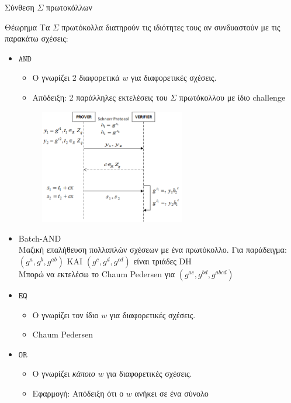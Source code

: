 \documentclass[handout]{beamer}
\begin{document}
\begin{frame}[allowframebreaks]{Σύνθεση $\Sigma$ πρωτοκόλλων}
\begin{block}{Θέωρημα} 
Τα $\Sigma$ πρωτόκολλα διατηρούν τις ιδιότητες τους αν συνδυαστούν με τις παρακάτω σχέσεις:
\end{block}
\begin{itemize}
\item $\mathtt{AND}$
\begin{itemize}
\item O \prv γνωρίζει 2 διαφορετικά $w$ για διαφορετικές σχέσεις.
\item Απόδειξη: 2 παράλληλες εκτελέσεις του  $\Sigma$ πρωτόκολλου με ίδιο challenge
\end{itemize}
\begin{figure}
\centering
\includegraphics[width=0.6\textwidth]{schnorrand.png}
\end{figure}
\framebreak
\item Batch-AND\\
Μαζική επαλήθευση πολλαπλών σχέσεων με ένα πρωτόκολλο.
Για παράδειγμα: \\ 
$(g^a, g^b, g^{ab})$ ΚΑΙ  $(g^c, g^d, g^{cd})$ είναι τριάδες DH\\
Μπορώ να εκτελέσω το Chaum Pedersen για $(g^{ac}, g^{bd}, g^{abcd})$
\item $\mathtt{EQ}$
\begin{itemize}
\item O \prv γνωρίζει τον ίδιο $w$ για διαφορετικές σχέσεις.
\item Chaum Pedersen
\end{itemize}
\item $\mathtt{OR}$
\begin{itemize}
\item O \prv γνωρίζει \emph{κάποιο} $w$ για διαφορετικές σχέσεις.
\item Εφαρμογή: Απόδειξη ότι ο $w$ ανήκει σε ένα σύνολο
\end{itemize}
\end{itemize} 
\end{frame}
\end{document}
